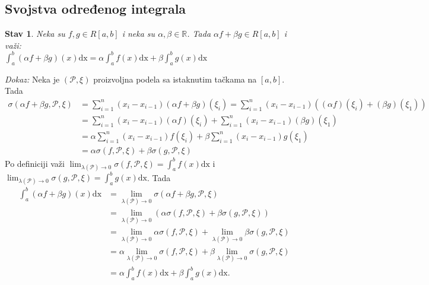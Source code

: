 \documentclass{article}
\newtheorem{stav}{Stav}[section]
\begin{document}
\subsection{Svojstva određenog integrala}
\begin{stavbox}
    \begin{stav}
        Neka su $f, g \in R[a, b]$ i neka su $\alpha, \beta \in \mathbb{R}$. Tada
        $\alpha f +\beta g \in R[a, b]$ i važi:\\
        $\displaystyle \int^b_a(\alpha f + \beta g)(x)\text{dx} = \alpha\int^b_af(x)\text{dx} + \beta\int^b_ag(x)\text{dx}$
    \end{stav}
\end{stavbox}
\textit{Dokaz:} Neka je $(\mathcal{P}, \xi)$ proizvoljna podela sa istaknutim tačkama na $[a, b]$. Tada
\begin{align*}
    \sigma(\alpha f+\beta g, \mathcal{P}, \xi) & = \sum^n_{i=1} (x_i - x_{i-1})(\alpha f+\beta g)(\xi_i)                           = \sum^n_{i=1} (x_i - x_{i-1})((\alpha f)(\xi_i) + (\beta g)(\xi_1)) \\
                                               & = \sum^n_{i=1} (x_i - x_{i-1})(\alpha f)(\xi_i) + \sum^n_{i=1} (x_i - x_{i-1})(\beta g)(\xi_1)                                                         \\
                                               & = \alpha\sum^n_{i=1} (x_i - x_{i-1}) f(\xi_i) + \beta\sum^n_{i=1} (x_i - x_{i-1})g(\xi_1)                                                              \\
                                               & = \alpha\sigma(f, \mathcal{P}, \xi) + \beta\sigma(g, \mathcal{P}, \xi)
\end{align*}
Po definiciji važi $\displaystyle \lim_{\lambda(\mathcal{P})\longrightarrow0} \sigma(f, \mathcal{P}, \xi) = \int^b_a f(x)\text{dx}$ i $\displaystyle \lim_{\lambda(\mathcal{P})\longrightarrow0} \sigma(g, \mathcal{P}, \xi) = \int^b_a g(x)\text{dx}$. Tada
\begin{align*}
    \int_{a}^{b}(\alpha f+\beta g)(x)\text{dx} & =\lim_{\lambda(\mathcal{P})\longrightarrow0} \sigma(\alpha f+\beta g, \mathcal{P}, \xi)                                                                     \\
                                               & =\lim_{\lambda(\mathcal{P})\longrightarrow0}(\alpha\sigma(f, \mathcal{P}, \xi) + \beta\sigma(g, \mathcal{P}, \xi))                                          \\
                                               & =\lim_{\lambda(\mathcal{P})\longrightarrow0}\alpha\sigma(f, \mathcal{P}, \xi) + \lim_{\lambda(\mathcal{P})\longrightarrow0}\beta\sigma(g, \mathcal{P}, \xi) \\
                                               & =\alpha\lim_{\lambda(\mathcal{P})\longrightarrow0}\sigma(f, \mathcal{P}, \xi) + \beta\lim_{\lambda(\mathcal{P})\longrightarrow0}\sigma(g, \mathcal{P}, \xi) \\
                                               & =\alpha \int^b_a f(x)\text{dx} +\beta\int^b_a g(x)\text{dx}.
\end{align*}
\end{document}
